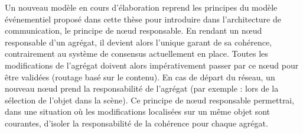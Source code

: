 Un nouveau modèle en cours d'élaboration reprend les principes du modèle événementiel 
proposé dans cette thèse pour introduire dans l'architecture de communication, le 
principe de \og n\oe ud responsable\fg{}. En rendant un n\oe ud responsable d'un 
agrégat, il devient alors l'unique garant de sa cohérence, contrairement au 
système de consensus actuellement en place. Toutes les modifications de 
l'agrégat doivent alors impérativement passer par ce n\oe ud pour être validées 
(routage basé sur le contenu). 
En cas de départ du réseau, un nouveau n\oe ud prend la responsabilité de 
l'agrégat (par exemple : lors de la sélection de l'objet dans la scène). 
Ce principe de \og n\oe ud responsable\fg{} permettrai, dans une situation où les 
modifications localisées sur un même objet sont courantes, d'isoler la 
responsabilité de la cohérence pour chaque agrégat. 


%


